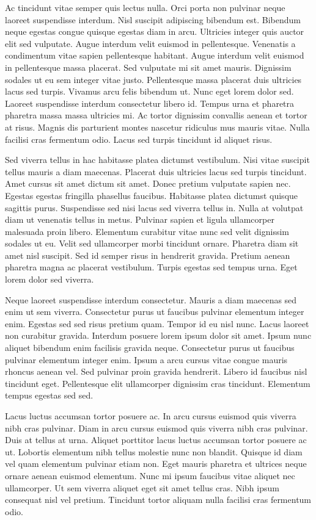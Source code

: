 \documentclass[11pt,a4paper]{article}
\begin{document}
Ac tincidunt vitae semper quis lectus nulla. Orci porta non pulvinar neque laoreet suspendisse interdum. Nisl suscipit adipiscing bibendum est. Bibendum neque egestas congue quisque egestas diam in arcu. Ultricies integer quis auctor elit sed vulputate. Augue interdum velit euismod in pellentesque. Venenatis a condimentum vitae sapien pellentesque habitant. Augue interdum velit euismod in pellentesque massa placerat. Sed vulputate mi sit amet mauris. Dignissim sodales ut eu sem integer vitae justo. Pellentesque massa placerat duis ultricies lacus sed turpis. Vivamus arcu felis bibendum ut. Nunc eget lorem dolor sed. Laoreet suspendisse interdum consectetur libero id. Tempus urna et pharetra pharetra massa massa ultricies mi. Ac tortor dignissim convallis aenean et tortor at risus. Magnis dis parturient montes nascetur ridiculus mus mauris vitae. Nulla facilisi cras fermentum odio. Lacus sed turpis tincidunt id aliquet risus.

Sed viverra tellus in hac habitasse platea dictumst vestibulum. Nisi vitae suscipit tellus mauris a diam maecenas. Placerat duis ultricies lacus sed turpis tincidunt. Amet cursus sit amet dictum sit amet. Donec pretium vulputate sapien nec. Egestas egestas fringilla phasellus faucibus. Habitasse platea dictumst quisque sagittis purus. Suspendisse sed nisi lacus sed viverra tellus in. Nulla at volutpat diam ut venenatis tellus in metus. Pulvinar sapien et ligula ullamcorper malesuada proin libero. Elementum curabitur vitae nunc sed velit dignissim sodales ut eu. Velit sed ullamcorper morbi tincidunt ornare. Pharetra diam sit amet nisl suscipit. Sed id semper risus in hendrerit gravida. Pretium aenean pharetra magna ac placerat vestibulum. Turpis egestas sed tempus urna. Eget lorem dolor sed viverra.

Neque laoreet suspendisse interdum consectetur. Mauris a diam maecenas sed enim ut sem viverra. Consectetur purus ut faucibus pulvinar elementum integer enim. Egestas sed sed risus pretium quam. Tempor id eu nisl nunc. Lacus laoreet non curabitur gravida. Interdum posuere lorem ipsum dolor sit amet. Ipsum nunc aliquet bibendum enim facilisis gravida neque. Consectetur purus ut faucibus pulvinar elementum integer enim. Ipsum a arcu cursus vitae congue mauris rhoncus aenean vel. Sed pulvinar proin gravida hendrerit. Libero id faucibus nisl tincidunt eget. Pellentesque elit ullamcorper dignissim cras tincidunt. Elementum tempus egestas sed sed.

Lacus luctus accumsan tortor posuere ac. In arcu cursus euismod quis viverra nibh cras pulvinar. Diam in arcu cursus euismod quis viverra nibh cras pulvinar. Duis at tellus at urna. Aliquet porttitor lacus luctus accumsan tortor posuere ac ut. Lobortis elementum nibh tellus molestie nunc non blandit. Quisque id diam vel quam elementum pulvinar etiam non. Eget mauris pharetra et ultrices neque ornare aenean euismod elementum. Nunc mi ipsum faucibus vitae aliquet nec ullamcorper. Ut sem viverra aliquet eget sit amet tellus cras. Nibh ipsum consequat nisl vel pretium. Tincidunt tortor aliquam nulla facilisi cras fermentum odio.
\end{document}
